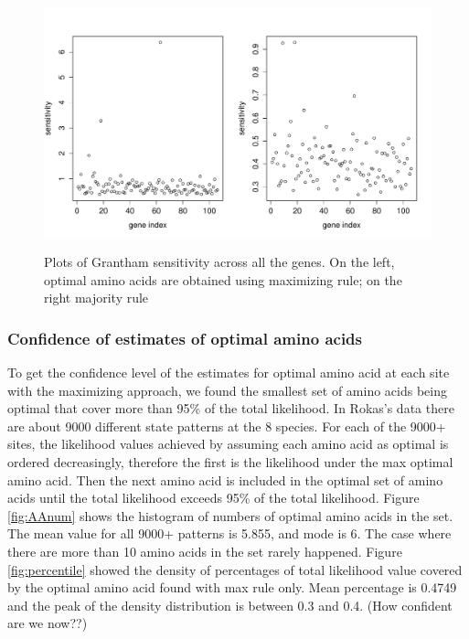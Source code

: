 \documentclass[13pt]{article}
\begin{document}
\begin{figure}[h]
\caption{Plots of Grantham sensitivity across all the genes. On the left, optimal amino acids are obtained using maximizing rule; on the right majority rule}
\centering
\includegraphics[width=\textwidth]{gvalue.pdf}
\label{fig:gvalue}
\end{figure}


\subsubsection{Confidence of estimates of optimal amino acids}
To get the confidence level of the estimates for optimal amino acid at each site with the maximizing approach, we found the smallest set of amino acids being optimal that cover more than 95\% of the total likelihood. In Rokas's data there are about 9000 different state patterns at the 8 species. For each of the 9000+ sites, the likelihood values achieved by assuming each amino acid as optimal is ordered decreasingly, therefore the first is the likelihood under the max optimal amino acid. Then the next amino acid is included in the optimal set of amino acids until the total likelihood exceeds 95\% of the total likelihood. Figure \ref{fig:AAnum} shows the histogram of numbers of optimal amino acids in the set. The mean value for all 9000+ patterns is 5.855, and mode is 6. The case where there are more than 10 amino acids in the set rarely happened. Figure \ref{fig:percentile} showed the density of percentages of total likelihood value covered by the optimal amino acid found with max rule only. Mean percentage is 0.4749 and the peak of the density distribution is between 0.3 and 0.4. (How confident are we now??)
\end{document}
